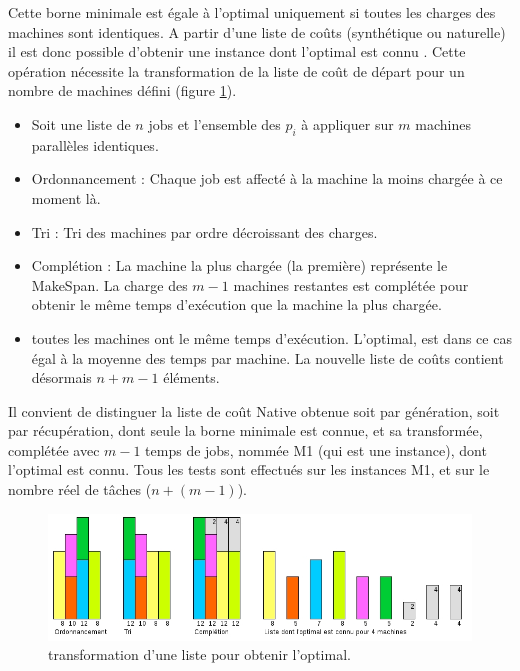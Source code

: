 \documentclass[a4paper,12pt]{report}
\theoremstyle{plain}				%
\theoremstyle{definition}				%
\newcommand{\lp}[1]{\todo[author=LP,color=yellow,inline]{#1}}
\begin{document}
Cette borne minimale est égale à l'optimal uniquement si toutes les charges des machines sont identiques.
A partir d'une liste de coûts (synthétique ou naturelle) il est donc possible d'obtenir une instance dont l'optimal est connu \cite{benoit2021update}. Cette opération nécessite la transformation de la liste de coût de départ pour un 
  nombre de machines défini (figure \ref{ex:maitriseOptimal}).
\begin{itemize}
	\item Soit une liste de $n$ jobs et l'ensemble des $p_i$ à appliquer sur $m$ machines parallèles identiques.
	\item Ordonnancement : Chaque job est affecté à la machine la moins chargée à ce moment là. 
	\item Tri : Tri des machines par ordre décroissant des charges.
	\item Complétion : La machine la plus chargée (la première) représente le MakeSpan. La charge des $m-1$ machines restantes est complétée
              \lp{Avec des tâches fictives} pour obtenir le même temps
              d'exécution que la machine la plus chargée.
	\item toutes les machines ont le même temps d'exécution. L'optimal, est dans ce cas égal à la 
	      moyenne des temps par machine. 
	      La nouvelle liste de coûts contient désormais $n + m-1$ éléments.
\end{itemize}

\bigskip 
Il convient de distinguer la liste de coût Native obtenue 
  soit par génération, 
  soit par récupération, 
  dont seule la borne minimale est connue, 
  et sa transformée, complétée avec $m-1$ temps de jobs, nommée M1 (qui est une instance), 
  dont l'optimal est connu.
Tous les tests sont effectués sur les instances M1, 
  et sur le nombre réel de tâches ($n + (m-1)$).

\begin{figure}
{\centering
\includegraphics[width=\columnwidth]{maitriseOptimal.jpg}
\caption{transformation d'une liste pour obtenir l'optimal.}
\label{ex:maitriseOptimal}
\par}
\end{figure}
\end{document}
